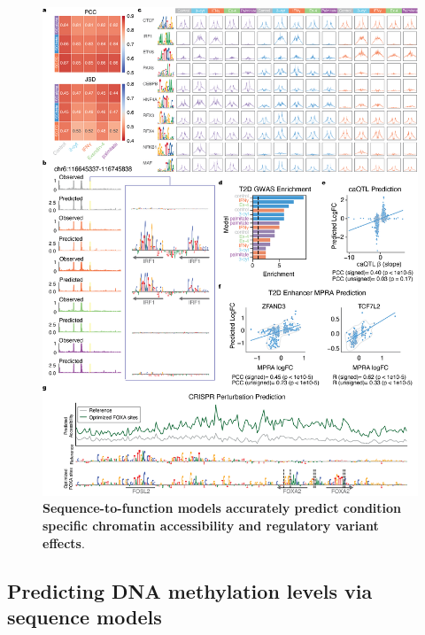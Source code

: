 \begin{figure}[!htbp]
    \centering
    \includegraphics[height=0.8\textheight, keepaspectratio]{3_figures-and-files/Fig4.png}
    \caption[Sequence-to-function models accurately predict condition specific chromatin accessibility and regulatory variant effects]{\textbf{Sequence-to-function models accurately predict condition specific chromatin accessibility and regulatory variant effects}.}
    \label{fig:3 Figure 4}
\end{figure}

\clearpage


\subsection{Predicting DNA methylation levels via sequence models}

